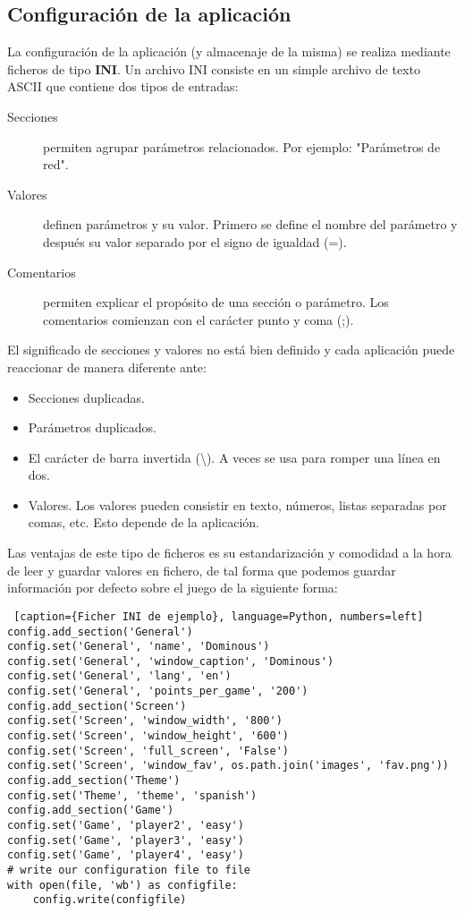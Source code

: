 \subsection{Configuración de la aplicación}

La configuración de la aplicación (y almacenaje de la misma) se realiza mediante ficheros de tipo \textbf{INI}. Un archivo
INI consiste en un simple archivo de texto ASCII que contiene dos tipos de entradas:

\begin{description}
    \item[Secciones] permiten agrupar parámetros relacionados. Por ejemplo: "Parámetros de red".
    \item[Valores] definen parámetros y su valor. Primero se define el nombre del parámetro y después su valor separado por
            el signo de igualdad (=).
    \item[Comentarios] permiten explicar el propósito de una sección o parámetro. Los comentarios comienzan con el carácter
            punto y coma (;).
\end{description}

El significado de secciones y valores no está bien definido y cada aplicación puede reaccionar de manera diferente ante:

\begin{itemize}
    \item Secciones duplicadas.
    \item Parámetros duplicados.
    \item El carácter de barra invertida (\textbackslash). A veces se usa para romper una línea en dos.
    \item Valores. Los valores pueden consistir en texto, números, listas separadas por comas, etc. Esto depende de la aplicación.
\end{itemize}

Las ventajas de este tipo de ficheros es su estandarización y comodidad a la hora de leer y guardar valores en fichero,
de tal forma que podemos guardar información por defecto sobre el juego de la siguiente forma:

\begin{lstlisting} [caption={Ficher INI de ejemplo}, language=Python, numbers=left]
config.add_section('General')
config.set('General', 'name', 'Dominous')
config.set('General', 'window_caption', 'Dominous')
config.set('General', 'lang', 'en')
config.set('General', 'points_per_game', '200')
config.add_section('Screen')
config.set('Screen', 'window_width', '800')
config.set('Screen', 'window_height', '600')
config.set('Screen', 'full_screen', 'False')
config.set('Screen', 'window_fav', os.path.join('images', 'fav.png'))
config.add_section('Theme')
config.set('Theme', 'theme', 'spanish')
config.add_section('Game')
config.set('Game', 'player2', 'easy')
config.set('Game', 'player3', 'easy')
config.set('Game', 'player4', 'easy')
# write our configuration file to file
with open(file, 'wb') as configfile:
    config.write(configfile)
\end{lstlisting}


